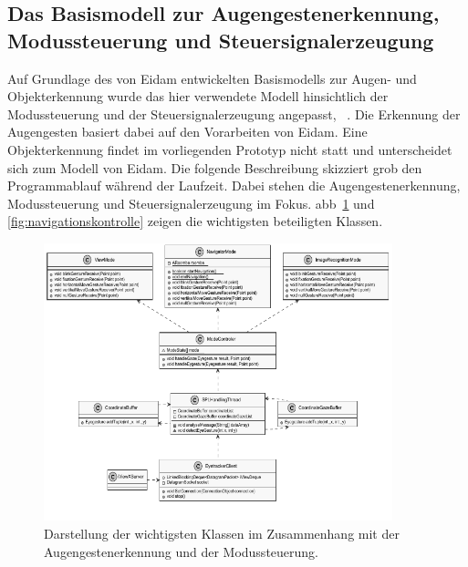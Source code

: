\subsection{Das Basismodell zur Augengestenerkennung, Modussteuerung und Steuersignalerzeugung}
Auf Grundlage des von Eidam entwickelten Basismodells zur Augen- und Objekterkennung wurde das hier verwendete Modell hinsichtlich der Modussteuerung und der Steuersignalerzeugung angepasst, \vgl~\cite[S.44]{Eidam2015}. Die Erkennung der Augengesten basiert dabei auf den Vorarbeiten von Eidam. Eine Objekterkennung findet im vorliegenden Prototyp nicht statt und unterscheidet sich zum Modell von Eidam. 
Die folgende Beschreibung skizziert grob den Programmablauf während der Laufzeit. Dabei stehen die Augengestenerkennung, Modussteuerung und Steuersignalerzeugung im Fokus. \acl{abb}~\ref{fig:moduskontroll} und \ref{fig:navigationskontrolle} zeigen die wichtigsten beteiligten Klassen. 

\begin{figure}[ht]
\begin{center}
\includegraphics[width=0.9\textwidth]{bilder/uml/moduskontrolle2.pdf}
\end{center}
\caption{Darstellung der wichtigsten Klassen im Zusammenhang mit der Augengestenerkennung und der Modussteuerung.}
\label{fig:moduskontroll}
\end{figure}

